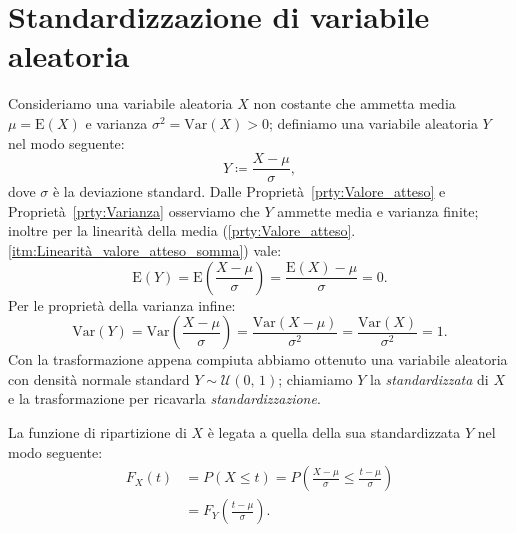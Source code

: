     \section{Standardizzazione di variabile aleatoria}
        \begin{defn}
            Consideriamo una variabile aleatoria $X$ non costante che ammetta media $\mu = \text{E}(X)$ e varianza $\sigma^2 = \text{Var}(X) > 0$; definiamo una variabile aleatoria $Y$ nel modo seguente:
            \begin{equation}\label{eq:Standardizzazione}
                Y \coloneqq \frac{X-\mu}{\sigma}
            ,\end{equation}
            dove $\sigma$ è la deviazione standard. Dalle Proprietà~\ref{prty:Valore_atteso} e Proprietà~\ref{prty:Varianza} osserviamo che $Y$ ammette media e varianza finite; inoltre per la linearità della media (\ref{prty:Valore_atteso}.\ref{itm:Linearità_valore_atteso_somma}) vale: \[
                \text{E}(Y) = \text{E}\left(\frac{X - \mu}{\sigma}\right) = \frac{\text{E}(X) - \mu}{\sigma} = 0
            .\] Per le proprietà della varianza infine: \[
            \text{Var}(Y) = \text{Var}\left(\frac{X - \mu}{\sigma}\right) = \frac{\text{Var}(X - \mu)}{\sigma^2} = \frac{\text{Var}(X)}{\sigma^2} = 1
        .\] Con la trasformazione appena compiuta abbiamo ottenuto una variabile aleatoria con densità normale standard $Y \sim \mathcal{U}(0,\,1)$; chiamiamo $Y$ la \textit{standardizzata} di $X$ e la trasformazione per ricavarla \textit{standardizzazione}.
        \end{defn}
        \begin{obsv}
            La funzione di ripartizione di $X$ è legata a quella della sua standardizzata $Y$ nel modo seguente:
            \begin{align*}
                F_X(t) &= P(X \leq t) = P\left(\frac{X - \mu}{\sigma} \leq \frac{t - \mu}{\sigma}\right) \\
                       &= F_Y\left(\frac{t - \mu}{\sigma}\right)
            .\end{align*}
        \end{obsv}
